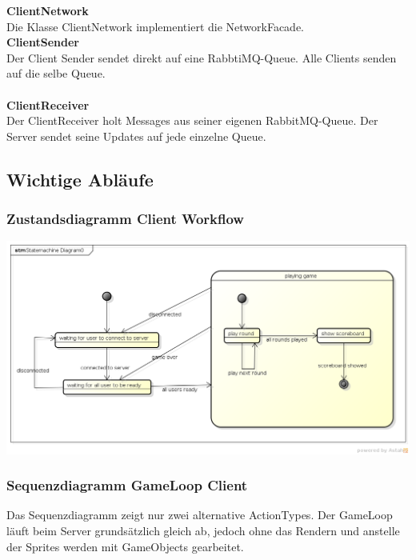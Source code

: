 \documentclass[11pt]{scrartcl}
\begin{document}
\textbf{ClientNetwork}\\
Die Klasse ClientNetwork implementiert die NetworkFacade.\\

\textbf{ClientSender}\\
Der Client Sender sendet direkt auf eine RabbtiMQ-Queue. Alle Clients senden auf die selbe Queue.
\\\\

\textbf{ClientReceiver}\\
Der ClientReceiver holt Messages aus seiner eigenen RabbitMQ-Queue. Der Server sendet seine Updates auf jede einzelne Queue.

\newpage

\subsection{Wichtige Abläufe}
\subsubsection{Zustandsdiagramm Client Workflow}
\includegraphics[scale=0.43]{StatemachineClient}

\newpage

\subsubsection{Sequenzdiagramm GameLoop Client}
Das Sequenzdiagramm zeigt nur zwei alternative ActionTypes. Der GameLoop läuft beim Server grundsätzlich gleich ab, jedoch ohne das Rendern und anstelle der Sprites werden mit GameObjects gearbeitet.\\
\end{document}
